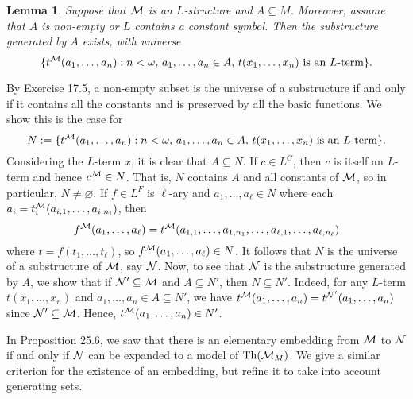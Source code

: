 \documentclass[10pt]{article}
\makeatletter
\DeclareMathOperator{\Th}{Th}
\theoremstyle{newstyle}
\newtheorem{lemma}[thm]{Lemma}
\newenvironment{pf}[1][\proofname]{\par
  \pushQED{\qed}%
  \normalfont \topsep0\p@\relax
  \trivlist
  \item[\hskip\labelsep\scshape
  #1\@addpunct{.}]\ignorespaces
}{%
  \popQED\endtrivlist\@endpefalse
}
\makeatother
\begin{document}
\begin{lemma}
Suppose that ${\cal M}$ is an $L$-structure and $A \subseteq M$. Moreover, assume that 
$A$ is non-empty or $L$ contains a constant symbol. Then the substructure generated by $A$ 
exists, with universe 
\[ \{t^{\cal M}(a_1, \dots, a_n) : n < \omega,\, a_1, \dots, a_n \in A,\, t(x_1, \dots, x_n) 
\text{ is an $L$-term}\}. \]
\end{lemma}
\begin{pf}
By Exercise 17.5, a non-empty subset is the universe of a substructure if and only if 
it contains all the constants and is preserved by all the basic functions. We show this 
is the case for 
\[ N := \{t^{\cal M}(a_1, \dots, a_n) : n < \omega,\, a_1, \dots, a_n \in A,\, t(x_1, \dots, x_n) 
\text{ is an $L$-term}\}. \]
Considering the $L$-term $x$, it is clear that $A \subseteq N$. If $c \in L^C$, then $c$ 
is itself an $L$-term and hence $c^{\cal M} \in N$. That is, $N$ contains $A$ and all 
constants of ${\cal M}$, so in particular, $N \neq \varnothing$. If 
$f \in L^F$ is $\ell$-ary and $a_1, \dots, a_\ell \in N$ where each
$a_i = t_i^{\cal M}(a_{i,1}, \dots, a_{i,n_i})$, then 
\[ f^{\cal M}(a_1, \dots, a_\ell) = t^{\cal M}(a_{1,1}, \dots, a_{1,n_1}, \dots, 
a_{\ell,1}, \dots, a_{\ell, n_\ell}) \] 
where $t = f(t_1, \dots, t_\ell)$, so $f^{\cal M}(a_1, \dots, a_\ell) \in N$. It follows that 
$N$ is the universe of a substructure of ${\cal M}$, say ${\cal N}$. Now, to see that 
${\cal N}$ is the substructure generated by $A$, we show that if ${\cal N}' \subseteq {\cal M}$ and 
$A \subseteq N'$, then $N \subseteq N'$. Indeed, for any $L$-term $t(x_1, \dots, x_n)$ and 
$a_1, \dots, a_n \in A \subseteq N'$, we have $t^{\cal M}(a_1, \dots, a_n) = 
t^{{\cal N}'}(a_1, \dots, a_n)$ since ${\cal N}' \subseteq {\cal M}$. Hence, 
$t^{\cal M}(a_1, \dots, a_n) \in N'$.
\end{pf}

In Proposition 25.6, we saw that there is an elementary embedding from ${\cal M}$ to ${\cal N}$ 
if and only if ${\cal N}$ can be expanded to a model of $\Th({\cal M}_M)$. We give a 
similar criterion for the existence of an embedding, but refine it to take into account 
generating sets. 
\end{document}
